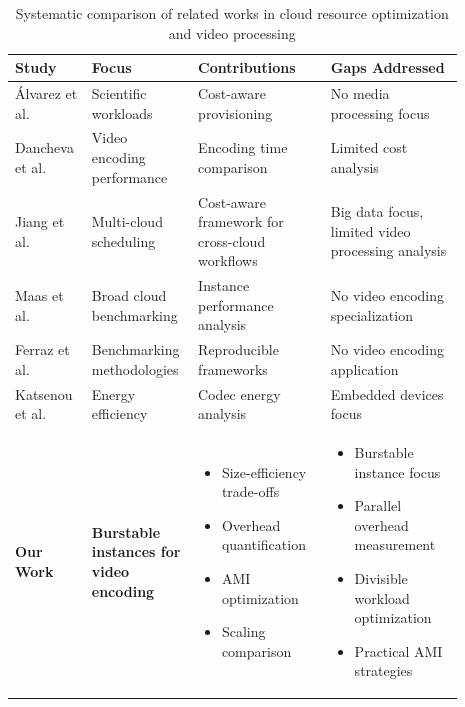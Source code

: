 \documentclass[conference]{IEEEtran}
\begin{document}
	\begin{table}[!htbp]
		\centering
		\caption{Systematic comparison of related works in cloud resource optimization and video processing}
		\label{tab:comparative_analysis}
		\begin{tabular}{|p{0.15\linewidth}|p{0.18\linewidth}|p{0.28\linewidth}|p{0.28\linewidth}|}
			\hline
			\textbf{Study} & \textbf{Focus} & \textbf{Contributions} & \textbf{Gaps Addressed} \\
			\hline
			Álvarez et al. & Scientific workloads & Cost-aware provisioning & No media processing focus \\
			\hline
			Dancheva et al. & Video encoding performance & Encoding time comparison & Limited cost analysis \\
			\hline
			Jiang et al. & Multi-cloud scheduling & Cost-aware framework for cross-cloud workflows & Big data focus, limited video processing analysis \\
			\hline
			Maas et al. & Broad cloud benchmarking & Instance performance analysis & No video encoding specialization \\
			\hline
			Ferraz et al. & Benchmarking methodologies & Reproducible frameworks & No video encoding application \\
			\hline
			Katsenou et al. & Energy efficiency & Codec energy analysis & Embedded devices focus \\
			\hline
			\textbf{Our Work} & \textbf{Burstable instances for video encoding} & 
			\scriptsize
			\begin{itemize}
				\item Size-efficiency trade-offs
				\item Overhead quantification  
				\item AMI optimization
				\item Scaling comparison
			\end{itemize}
			& 
			\scriptsize
			\begin{itemize}
				\item Burstable instance focus
				\item Parallel overhead measurement
				\item Divisible workload optimization
				\item Practical AMI strategies
			\end{itemize}
			\\
			\hline
		\end{tabular}
	\end{table}
	
\end{document}
